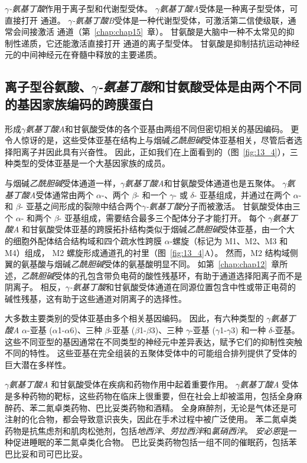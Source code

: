 \textit{$\gamma$-氨基丁酸}作用于离子型和代谢型受体。
\textit{$\gamma$氨基丁酸A}受体是一种离子型受体，可直接打开  通道。
\textit{$\gamma$-氨基丁酸B}受体是一种代谢型受体，可激活第二信使级联，通常会间接激活  通道（第~\ref{chap:chap15}~章）。 
甘氨酸是大脑中一种不太常见的抑制性递质，它还能激活直接打开  通道的离子型受体。
甘氨酸是抑制拮抗运动神经元的中间神经元在脊髓中释放的主要递质。



\subsection{离子型谷氨酸、\textit{$\gamma$-氨基丁酸}和甘氨酸受体是由两个不同的基因家族编码的跨膜蛋白}

形成\textit{$\gamma$氨基丁酸A}和甘氨酸受体的各个亚基由两组不同但密切相关的基因编码。
更令人惊讶的是，这些受体亚基在结构上与烟碱\textit{乙酰胆碱}受体亚基相关，尽管后者选择阳离子并因此具有兴奋性。 
因此，正如我们在上面看到的（图~\ref{fig:13_4}），三种类型的受体亚基是一个大基因家族的成员。


与烟碱\textit{乙酰胆碱}受体通道一样，\textit{$\gamma$氨基丁酸A}和甘氨酸受体通道也是五聚体。
\textit{$\gamma$氨基丁酸A}受体通常由两个 $\alpha$-、两个 $\beta$- 和一个 $\gamma$- 或 $\delta$- 亚基组成，并通过在两个 $\alpha$- 和 $\beta$- 亚基之间形成的裂隙中结合两个\textit{$\gamma$-氨基丁酸}分子而被激活。
甘氨酸受体由三个 $\alpha$- 和两个 $\beta$- 亚基组成，需要结合最多三个配体分子才能打开。
每个 \textit{$\gamma$氨基丁酸A} 和甘氨酸受体亚基的跨膜拓扑结构类似于烟碱\textit{乙酰胆碱}受体亚基，由一个大的细胞外配体结合结构域和四个疏水性跨膜 $\alpha$-螺旋（标记为 M1、M2、M3 和 M4）组成， M2 螺旋形成通道孔的衬里（图~\ref{fig:13_4}A）。
然而，M2 结构域侧翼的氨基酸与烟碱\textit{乙酰胆碱}受体的氨基酸明显不同。
如第~\ref{chap:chap12}~章所述，\textit{乙酰胆碱}受体的孔包含带负电荷的酸性残基环，有助于通道选择阳离子而不是阴离子。
相反，\textit{$\gamma$-氨基丁酸}和甘氨酸受体通道在同源位置包含中性或带正电荷的碱性残基，这有助于这些通道对阴离子的选择性。


大多数主要类别的受体亚基由多个相关基因编码。
因此，有六种类型的 \textit{$\gamma$氨基丁酸A} $\alpha$-亚基 ($\alpha$1-$\alpha$6)、三种 $\beta$-亚基 ($\beta$1-$\beta$3)、三种 $\gamma$-亚基 ($\gamma$1-$\gamma$3) 和一种 $\delta$-亚基。
这些不同亚型的基因通常在不同类型的神经元中差异表达，赋予它们的抑制性突触不同的特性。
这些亚基在完全组装的五聚体受体中的可能组合排列提供了受体的巨大潜在多样性。


\textit{$\gamma$氨基丁酸A} 和甘氨酸受体在疾病和药物作用中起着重要作用。
\textit{$\gamma$氨基丁酸A} 受体是多种药物的靶标，这些药物在临床上很重要，但在社会上却被滥用，包括全身麻醉药、苯二氮卓类药物、巴比妥类药物和酒精。
全身麻醉剂，无论是气体还是可注射的化合物，都会导致意识丧失，因此在手术过程中被广泛使用。
苯二氮卓类药物是抗焦虑剂和肌肉松弛剂，包括\textit{地西泮}、\textit{劳拉西泮}和\textit{氯硝西泮}。
\textit{安必恩}是一种促进睡眠的苯二氮卓类化合物。
巴比妥类药物包括一组不同的催眠药，包括苯巴比妥和司可巴比妥。


